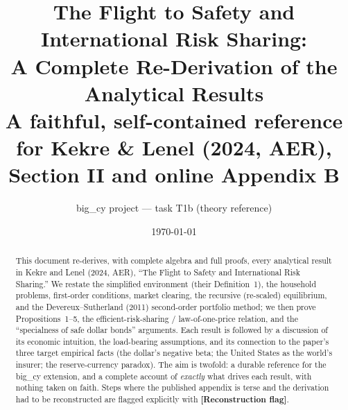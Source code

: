 \documentclass[11pt]{article}
\title{\textbf{The Flight to Safety and International Risk Sharing:\\
A Complete Re-Derivation of the Analytical Results}\\[4pt]
\large A faithful, self-contained reference for Kekre \& Lenel (2024, AER),\\
Section II and online Appendix B}
\author{big\_cy project --- task T1b (theory reference)}
\date{\today}
\theoremstyle{plain}
\theoremstyle{definition}
\numberwithin{equation}{section}
\begin{document}
\maketitle

\begin{abstract}
\noindent This document re-derives, with complete algebra and full proofs, every
analytical result in Kekre and Lenel (2024, AER), ``The Flight to Safety and
International Risk Sharing.'' We restate the simplified environment (their
Definition~1), the household problems, first-order conditions, market clearing,
the recursive (re-scaled) equilibrium, and the Devereux--Sutherland (2011)
second-order portfolio method; we then prove Propositions~1--5, the
efficient-risk-sharing / law-of-one-price relation, and the ``specialness of safe
dollar bonds'' arguments. Each result is followed by a discussion of its economic
intuition, the load-bearing assumptions, and its connection to the paper's three
target empirical facts (the dollar's negative beta; the United States as the
world's insurer; the reserve-currency paradox). The aim is twofold: a durable
reference for the big\_cy extension, and a complete account of \emph{exactly} what
drives each result, with nothing taken on faith. Steps where the published
appendix is terse and the derivation had to be reconstructed are flagged
explicitly with \textbf{[Reconstruction flag]}.
\end{abstract}

\tableofcontents
\newpage
























\end{document}
